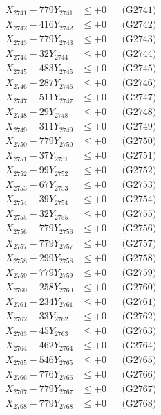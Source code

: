 \documentclass[a4paper,10pt]{article}
\begin{document}
{\begin{align}
\allowbreak
X_{2741} - 779Y_{2741} &\leq +0 && \text{(G2741)} \\
X_{2742} - 416Y_{2742} &\leq +0 && \text{(G2742)} \\
X_{2743} - 779Y_{2743} &\leq +0 && \text{(G2743)} \\
X_{2744} - 32Y_{2744} &\leq +0 && \text{(G2744)} \\
X_{2745} - 483Y_{2745} &\leq +0 && \text{(G2745)} \\
X_{2746} - 287Y_{2746} &\leq +0 && \text{(G2746)} \\
X_{2747} - 511Y_{2747} &\leq +0 && \text{(G2747)} \\
X_{2748} - 29Y_{2748} &\leq +0 && \text{(G2748)} \\
X_{2749} - 311Y_{2749} &\leq +0 && \text{(G2749)} \\
X_{2750} - 779Y_{2750} &\leq +0 && \text{(G2750)} \\
\allowbreak
X_{2751} - 37Y_{2751} &\leq +0 && \text{(G2751)} \\
X_{2752} - 99Y_{2752} &\leq +0 && \text{(G2752)} \\
X_{2753} - 67Y_{2753} &\leq +0 && \text{(G2753)} \\
X_{2754} - 39Y_{2754} &\leq +0 && \text{(G2754)} \\
X_{2755} - 32Y_{2755} &\leq +0 && \text{(G2755)} \\
X_{2756} - 779Y_{2756} &\leq +0 && \text{(G2756)} \\
X_{2757} - 779Y_{2757} &\leq +0 && \text{(G2757)} \\
X_{2758} - 299Y_{2758} &\leq +0 && \text{(G2758)} \\
X_{2759} - 779Y_{2759} &\leq +0 && \text{(G2759)} \\
X_{2760} - 258Y_{2760} &\leq +0 && \text{(G2760)} \\
\allowbreak
X_{2761} - 234Y_{2761} &\leq +0 && \text{(G2761)} \\
X_{2762} - 33Y_{2762} &\leq +0 && \text{(G2762)} \\
X_{2763} - 45Y_{2763} &\leq +0 && \text{(G2763)} \\
X_{2764} - 462Y_{2764} &\leq +0 && \text{(G2764)} \\
X_{2765} - 546Y_{2765} &\leq +0 && \text{(G2765)} \\
X_{2766} - 776Y_{2766} &\leq +0 && \text{(G2766)} \\
X_{2767} - 779Y_{2767} &\leq +0 && \text{(G2767)} \\
X_{2768} - 779Y_{2768} &\leq +0 && \text{(G2768)} \\

\end{align}}
\end{document}
